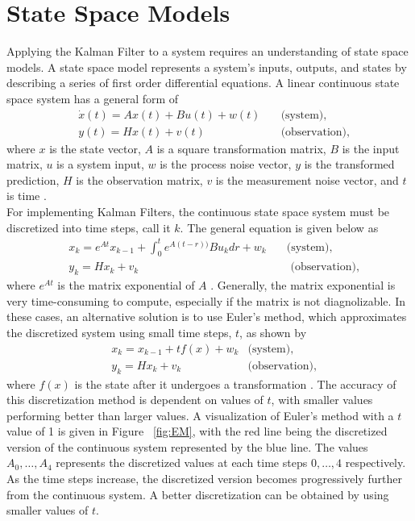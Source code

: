 \chapter{State Space Models}
\label{chap:two}


Applying the Kalman Filter to a system requires an understanding of state space models. A state space model represents a system's inputs, outputs, and states by describing a series of first order differential equations. A linear continuous state space system has a general form of 
\begin{align*}
&\dot x(t)= A x(t) + B u(t) +w(t) \quad &\text{(system)}, \\
&y(t) = H x(t) +v(t) \quad &\text{(observation)} ,
\end{align*}
where $x$ is the state vector, $A$ is a square transformation matrix, $B$ is the input matrix, $u$ is a system input, $w$ is the process noise vector, $y$ is the transformed prediction, $H$ is the observation matrix, $v$ is the measurement noise vector, and $t$ is time \cite{bolviken}. \\

\noindent For implementing Kalman Filters, the continuous state space system must be discretized into time steps, call it $k$. The general equation is given below as
\begin{align*}
& x_k= e^{At}x_{k-1} + \int_0^t e^{A(t-r))} B u_k dr + w_k \quad &\text{(system)}, \\
&y_k = H x_k + v_k  &\text{   (observation)} ,
\end{align*}
where $e^{At}$ is the matrix exponential of $A$  \cite{bolviken}.  Generally, the matrix exponential is very time-consuming to compute, especially if the matrix is not diagnolizable. In these cases, an alternative solution is to use Euler's method, which approximates the discretized system using small time steps, $t$,  as shown by 
\begin{align*}
& x_k= x_{k-1} + t f(x) + w_k  &\text{(system)}, \\
&y_k = H x_k + v_k  &\text{(observation)},
\end{align*}
where $f(x)$ is the state after it undergoes a transformation \cite{griffiths_higham_2011}. The accuracy of this discretization method is dependent on values of $t$, with smaller values performing better than larger values. A visualization of Euler's method with a $t$ value of 1 is given in Figure ~\ref{fig:EM}, with the red line being the discretized version of the continuous system represented by the blue line. The values $A_0, \hdots, A_4$ represents the discretized values at each time steps $0,\hdots, 4$ respectively. As the time steps increase, the discretized version becomes progressively further from the continuous system. A better discretization can be obtained by using smaller values of $t$. 

